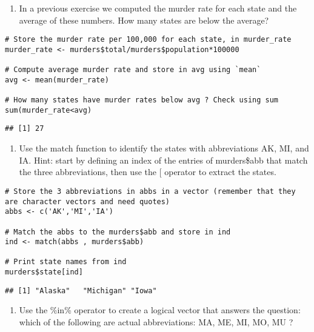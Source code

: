 \documentclass[
]{article}
\providecommand{\tightlist}{%
  \setlength{\itemsep}{0pt}\setlength{\parskip}{0pt}}
\begin{document}
\begin{enumerate}
\def\labelenumi{\arabic{enumi}.}
\setcounter{enumi}{4}
\tightlist
\item
  In a previous exercise we computed the murder rate for each state and
  the average of these numbers. How many states are below the average?
\end{enumerate}

\begin{verbatim}
# Store the murder rate per 100,000 for each state, in murder_rate
murder_rate <- murders$total/murders$population*100000

# Compute average murder rate and store in avg using `mean` 
avg <- mean(murder_rate)

# How many states have murder rates below avg ? Check using sum 
sum(murder_rate<avg)
\end{verbatim}

\begin{verbatim}
## [1] 27
\end{verbatim}

\begin{enumerate}
\def\labelenumi{\arabic{enumi}.}
\setcounter{enumi}{5}
\tightlist
\item
  Use the match function to identify the states with abbreviations AK,
  MI, and IA. Hint: start by defining an index of the entries of
  murders\$abb that match the three abbreviations, then use the {[}
  operator to extract the states.
\end{enumerate}

\begin{verbatim}
# Store the 3 abbreviations in abbs in a vector (remember that they are character vectors and need quotes)
abbs <- c('AK','MI','IA')

# Match the abbs to the murders$abb and store in ind
ind <- match(abbs , murders$abb)

# Print state names from ind
murders$state[ind]
\end{verbatim}

\begin{verbatim}
## [1] "Alaska"   "Michigan" "Iowa"
\end{verbatim}

\begin{enumerate}
\def\labelenumi{\arabic{enumi}.}
\setcounter{enumi}{6}
\tightlist
\item
  Use the \%in\% operator to create a logical vector that answers the
  question: which of the following are actual abbreviations: MA, ME, MI,
  MO, MU ?
\end{enumerate}
\end{document}
